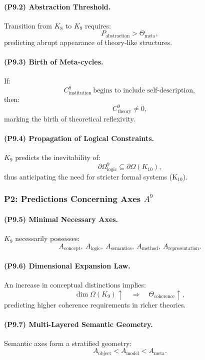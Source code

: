 \paragraph{(P9.2) Abstraction Threshold.}
Transition from $K_8$ to $K_9$ requires:
\[
P_{\mathrm{abstraction}} > \Theta_{\mathrm{meta}},
\]
predicting abrupt appearance of theory-like structures.

\paragraph{(P9.3) Birth of Meta-cycles.}
If:
\[
C_{\mathrm{institution}}^{8}
\ \text{begins to include self-description},
\]
then:
\[
C_{\mathrm{theory}}^9 \neq 0,
\]
marking the birth of theoretical reflexivity.

\paragraph{(P9.4) Propagation of Logical Constraints.}
$K_9$ predicts the inevitability of:
\[
\partial\Omega_{\mathrm{logic}}^{9}
\subseteq \partial\Omega(K_{10}),
\]
thus anticipating the need for stricter formal systems (K$_{10}$).

\subsubsection{P2: Predictions Concerning Axes \texorpdfstring{$A^9$}{A^9}}

\paragraph{(P9.5) Minimal Necessary Axes.}
$K_9$ necessarily possesses:
\[
A_{\mathrm{concept}},\
A_{\mathrm{logic}},\
A_{\mathrm{semantics}},\
A_{\mathrm{method}},\
A_{\mathrm{representation}}.
\]

\paragraph{(P9.6) Dimensional Expansion Law.}
An increase in conceptual distinctions implies:
\[
\dim \Omega(K_9) \uparrow
\quad \Rightarrow \quad
\Theta_{\mathrm{coherence}} \uparrow,
\]
predicting higher coherence requirements in richer theories.

\paragraph{(P9.7) Multi-Layered Semantic Geometry.}
Semantic axes form a stratified geometry:
\[
A_{\mathrm{object}} < A_{\mathrm{model}} < A_{\mathrm{meta}}.
\]

